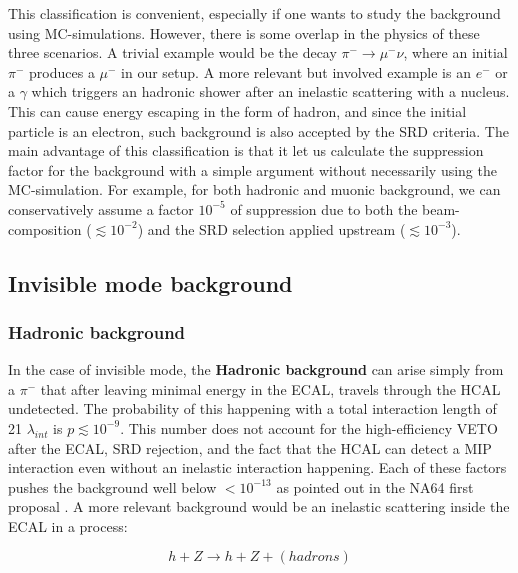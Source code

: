 This classification is convenient, especially if one wants to study the background using MC-simulations. However, there is some overlap in the physics of these three scenarios. A trivial example would be the decay $\pi^- \rightarrow \mu^-\nu$, where an initial $\pi^-$ produces a $\mu^-$ in our setup. A more relevant but involved example is an $e^-$ or a $\gamma$ which triggers an hadronic shower after an inelastic scattering with a nucleus. This can cause energy escaping in the form of hadron, and since the initial particle is an electron, such background is also accepted by the SRD criteria. The main advantage of this classification is that it let us calculate the suppression factor for the background with a simple argument without necessarily using the MC-simulation. For example, for both hadronic and muonic background, we can conservatively assume a factor $10^{-5}$ of suppression due to both the beam-composition ($\lesssim 10^{-2}$) and the SRD selection applied upstream ($\lesssim 10^{-3}$).

\subsection{Invisible mode background}
\label{ch3:sec:bkg:inv}

\subsubsection{Hadronic background}
\label{ch3:sec:bkg:inv:hadr}


In the case of invisible mode, the \textbf{Hadronic background} can arise simply from a $\pi^-$ that after leaving minimal energy in the ECAL, travels through the HCAL undetected. The probability of this happening with a total interaction length of 21 $\lambda_{int}$ is $p\lesssim 10^{-9}$. This number does not account for the high-efficiency VETO after the ECAL, SRD rejection, and the fact that the HCAL can detect a MIP interaction even without an inelastic interaction happening. Each of these factors pushes the background well below $<10^{-13}$ as pointed out in the NA64 first proposal \cite{Andreas:2013lya}. A more relevant background would be an inelastic scattering inside the ECAL in a process:

\begin{equation}
  \label{eq:pion-nucleus-scattering}
  h + Z \longrightarrow h + Z + (hadrons)
\end{equation}

